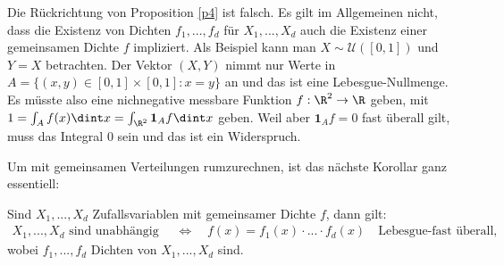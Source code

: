 \begin{bem}
	Die R\"uckrichtung von Proposition \ref{p4} ist falsch. Es gilt im Allgemeinen nicht, dass die Existenz von Dichten $f_1,...,f_d$ f\"ur $X_1, ..., X_d$ auch die Existenz einer gemeinsamen Dichte $f$ impliziert. Als Beispiel kann man $X\sim \mathcal U([0,1])$ und $Y=X$ betrachten. Der Vektor $(X,Y)$ nimmt nur Werte in $A=\{(x,y) \in [0,1]\times [0,1]:x=y\}$ an und das ist eine Lebesgue-Nullmenge. Es m\"usste also eine nichnegative messbare Funktion $f:\R^2\to \R$ geben, mit $1=\int_A f(x)\dint x=\int_{\R^2} \mathbf 1_{A} f \dint x$ geben. Weil aber $\mathbf 1_A f=0$ fast \"uberall gilt, muss das Integral $0$ sein und das ist ein Widerspruch.
\end{bem}
Um mit gemeinsamen Verteilungen rumzurechnen, ist das n\"achste Korollar ganz essentiell:
\begin{korollar}
	Sind $X_1,...,X_d$ Zufallsvariablen mit gemeinsamer Dichte $f$, dann gilt: 
	\begin{align*}	
		X_1,...,X_d\text{ sind unabhängig }\quad \Leftrightarrow \quad f(x) = f_1(x)\cdot ... \cdot f_d(x)\quad \text{Lebesgue-fast \"uberall},
	\end{align*}	
	wobei $f_1,...,f_d$ Dichten von $X_1,...,X_d$ sind.
\end{korollar}

